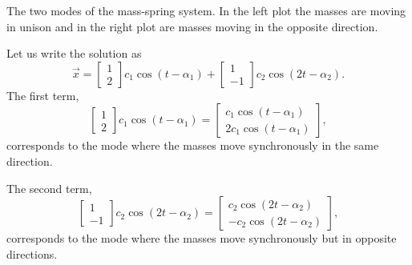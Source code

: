\begin{example}
\begin{myfig}
\capstart
\caption{The two modes of the mass-spring system.  In the left plot
the masses are moving in unison and in the right plot are masses moving in the
opposite direction.\label{sosa:modesfig}}
\end{myfig}

Let us write the solution as
\begin{equation*}
\vec{x} = 
\begin{bmatrix} 1 \\ 2 \end{bmatrix}
c_1 \cos (t - \alpha_1 )
+
\begin{bmatrix} 1 \\ -1 \end{bmatrix}
c_2 \cos (2t - \alpha_2 ) .
\end{equation*}
The first term,
\begin{equation*}
\begin{bmatrix} 1 \\ 2 \end{bmatrix}
c_1 \cos (t - \alpha_1 )
=
\begin{bmatrix}
c_1 \cos (t - \alpha_1 ) \\
2c_1 \cos (t - \alpha_1 )
\end{bmatrix} ,
\end{equation*}
corresponds to the mode where the masses move synchronously
in the same direction.

The second term,
\begin{equation*}
\begin{bmatrix} 1 \\ -1 \end{bmatrix}
c_2 \cos (2t - \alpha_2 )
=
\begin{bmatrix}
c_2 \cos (2t - \alpha_2 ) \\
- c_2 \cos (2t - \alpha_2 )
\end{bmatrix} ,
\end{equation*}
corresponds to the mode where the masses move synchronously
but in opposite directions.


\end{example}
